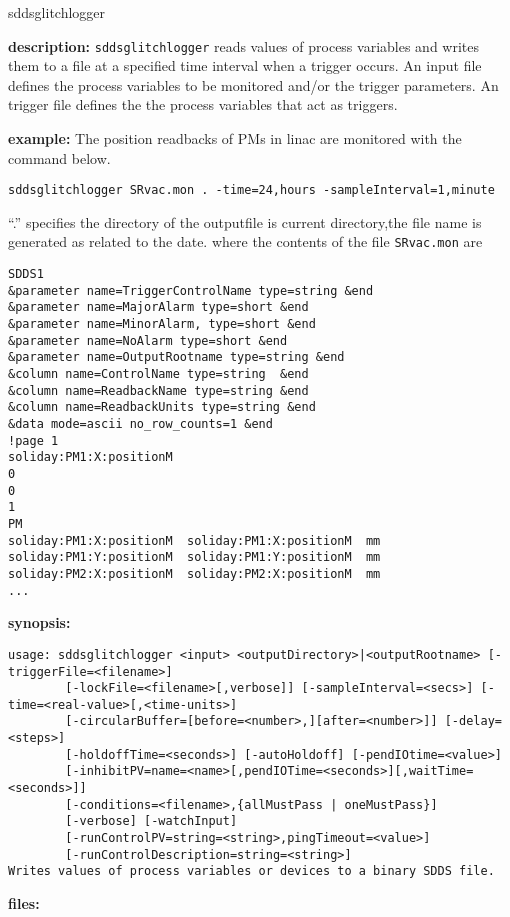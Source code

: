 \begin{sddsprog}{sddsglitchlogger}
\item {\bf description:}
\verb+sddsglitchlogger+ reads values of process variables and writes them to a file at a specified time interval when a trigger occurs.
An input file defines the process variables to be monitored and/or the trigger parameters.
An trigger file defines the the process variables that act as triggers.
\item {\bf example:} 
% 
The position readbacks of PMs in linac are monitored with the command below.
\begin{verbatim}
sddsglitchlogger SRvac.mon . -time=24,hours -sampleInterval=1,minute
\end{verbatim}
``.'' specifies the directory of the outputfile is current directory,the file name is generated
as related to the date.
where the contents of the file \verb+SRvac.mon+ are
\begin{verbatim}
SDDS1
&parameter name=TriggerControlName type=string &end
&parameter name=MajorAlarm type=short &end
&parameter name=MinorAlarm, type=short &end
&parameter name=NoAlarm type=short &end
&parameter name=OutputRootname type=string &end
&column name=ControlName type=string  &end
&column name=ReadbackName type=string &end
&column name=ReadbackUnits type=string &end
&data mode=ascii no_row_counts=1 &end
!page 1
soliday:PM1:X:positionM
0
0
1
PM
soliday:PM1:X:positionM  soliday:PM1:X:positionM  mm
soliday:PM1:Y:positionM  soliday:PM1:Y:positionM  mm
soliday:PM2:X:positionM  soliday:PM2:X:positionM  mm
...
\end{verbatim}
\item {\bf synopsis:} 
\begin{verbatim}
usage: sddsglitchlogger <input> <outputDirectory>|<outputRootname> [-triggerFile=<filename>]
        [-lockFile=<filename>[,verbose]] [-sampleInterval=<secs>] [-time=<real-value>[,<time-units>]
        [-circularBuffer=[before=<number>,][after=<number>]] [-delay=<steps>]
        [-holdoffTime=<seconds>] [-autoHoldoff] [-pendIOtime=<value>]
        [-inhibitPV=name=<name>[,pendIOTime=<seconds>][,waitTime=<seconds>]]
        [-conditions=<filename>,{allMustPass | oneMustPass}]
        [-verbose] [-watchInput]
        [-runControlPV=string=<string>,pingTimeout=<value>]
        [-runControlDescription=string=<string>]
Writes values of process variables or devices to a binary SDDS file.
\end{verbatim}
\item {\bf files:}

\end{sddsprog}
